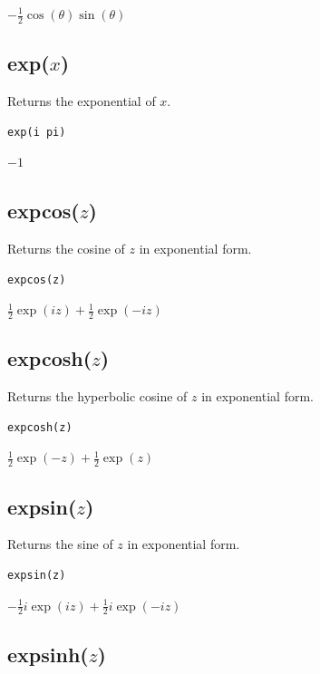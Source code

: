 \documentclass[12pt]{article}
\begin{document}
$\displaystyle
-\tfrac{1}{2}\cos(\theta)\sin(\theta)
$

\subsection*{exp($x$)}

Returns the exponential of $x$.

{\color{blue}
\begin{verbatim}
exp(i pi)
\end{verbatim}
}

\noindent
$-1$

\subsection*{expcos($z$)}

Returns the cosine of $z$ in exponential form.

{\color{blue}
\begin{verbatim}
expcos(z)
\end{verbatim}
}

\noindent
$\displaystyle \tfrac{1}{2}\exp(iz)+\tfrac{1}{2}\exp(-iz)$

\subsection*{expcosh($z$)}

Returns the hyperbolic cosine of $z$ in exponential form.

{\color{blue}
\begin{verbatim}
expcosh(z)
\end{verbatim}
}

\noindent
$\displaystyle \tfrac{1}{2}\exp(-z)+\tfrac{1}{2}\exp(z)$

\subsection*{expsin($z$)}

Returns the sine of $z$ in exponential form.

{\color{blue}
\begin{verbatim}
expsin(z)
\end{verbatim}
}

\noindent
$\displaystyle -\tfrac{1}{2}i\exp(iz)+\tfrac{1}{2}i\exp(-iz)$

\subsection*{expsinh($z$)}
\end{document}
